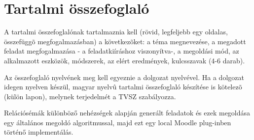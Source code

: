 \chapter*{Tartalmi összefoglaló}

A tartalmi összefoglalónak tartalmaznia kell (rövid, legfeljebb egy oldalas, összefüggõ megfogalmazásban)
a következõket: a téma megnevezése, a megadott feladat megfogalmazása - a feladatkiíráshoz viszonyítva-,
a megoldási mód, az alkalmazott eszközök, módszerek, az elért eredmények, kulcsszavak (4-6 darab).

Az összefoglaló nyelvének meg kell egyeznie a dolgozat nyelvével. Ha a dolgozat idegen nyelven készül,
magyar nyelvû tartalmi összefoglaló készítése is kötelezõ (külön lapon), melynek terjedelmét a TVSZ szabályozza.

Relációsémák különböző nehézségek alapján generált feladatok és ezek megoldása egy általános megoldó algoritmussal, majd ezt egy local Moodle plug-inben történő implementálás. 